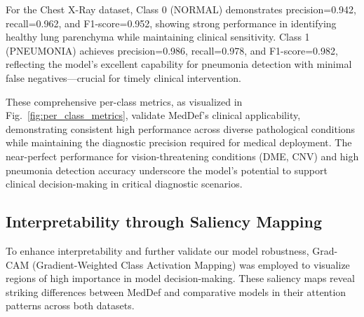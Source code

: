 \documentclass[preprint,12pt]{elsarticle}
\begin{document}
For the Chest X-Ray dataset, Class 0 (NORMAL) demonstrates precision=0.942, recall=0.962, and F1-score=0.952, showing strong performance in identifying healthy lung parenchyma while maintaining clinical sensitivity. Class 1 (PNEUMONIA) achieves precision=0.986, recall=0.978, and F1-score=0.982, reflecting the model's excellent capability for pneumonia detection with minimal false negatives—crucial for timely clinical intervention.

These comprehensive per-class metrics, as visualized in Fig.~\ref{fig:per_class_metrics}, validate MedDef's clinical applicability, demonstrating consistent high performance across diverse pathological conditions while maintaining the diagnostic precision required for medical deployment. The near-perfect performance for vision-threatening conditions (DME, CNV) and high pneumonia detection accuracy underscore the model's potential to support clinical decision-making in critical diagnostic scenarios.

\subsection{Interpretability through Saliency Mapping}
To enhance interpretability and further validate our model robustness, Grad-CAM (Gradient-Weighted Class Activation Mapping) was employed to visualize regions of high importance in model decision-making. These saliency maps reveal striking differences between MedDef and comparative models in their attention patterns across both datasets.
\end{document}
